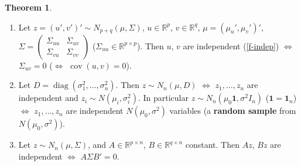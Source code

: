\documentclass[12pt]{article}
\newcommand{\R}{\mathbb R}
\newcommand{\one}{\mathbf 1}
\DeclareMathOperator{\diag}{diag}
\DeclareMathOperator\cov{cov}
\theoremstyle{definition}
\newtheorem{theorem}{Theorem}
\begin{document}
\begin{theorem}\label{h-thm-indep}
\begin{enumerate}
\item Let \(z=(u',v')'\sim N_{p+q}(\mu,\Sigma)\), \(u\in\R^p\), \(v\in\R^q\), \(\mu=(\mu_u',\mu_v')'\),
\(\Sigma=\left(\begin{smallmatrix}\Sigma_{uu}&\Sigma_{uv}\\\Sigma_{vu}&\Sigma_{vv}\end{smallmatrix}\right)\)
(\(\Sigma_{uu}\in\R^{p\times p}\)). Then \(u\), \(v\) are independent (\ref{f-indep}) \(\iff\) \(\Sigma_{uv}=0\) (\(\iff\)
\(\cov(u,v)=0\)).
\item Let \(D=\diag(\sigma_1^2,\dots,\sigma_n^2)\). Then \(z\sim N_n(\mu,D)\) \(\iff\) \(z_1,\dots,z_n\) are independent
and \(z_i\sim N(\mu_i,\sigma_i^2)\). In particular \(z\sim N_n(\mu_0\one,\sigma^2I_n)\) (\(\one=\one_n\)) \(\iff\) \(z_1,\dots,z_n\) are
independent \(N(\mu_0,\sigma^2)\) variables (a \textbf{random sample} from \(N(\mu_0,\sigma^2)\)).
\item Let \(z\sim N_n(\mu,\Sigma)\), and \(A\in\R^{p\times n}\), \(B\in\R^{q\times n}\) constant. Then \(Az\), \(Bz\) are
independent \(\iff\) \(A\Sigma B'=0\).
\end{enumerate}
\end{theorem}
\end{document}
